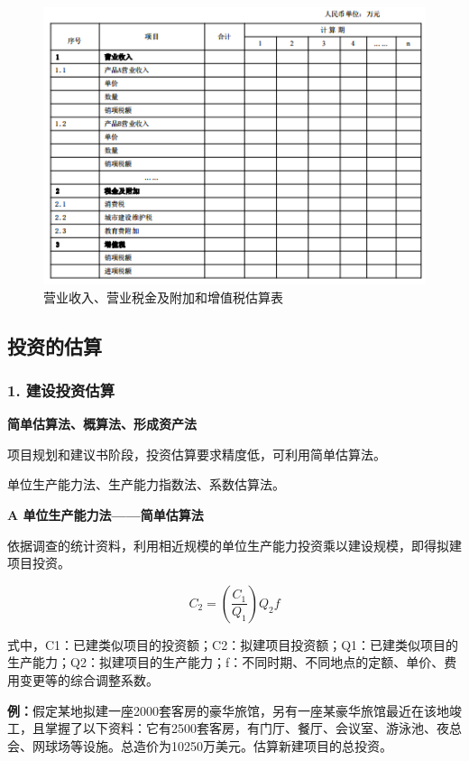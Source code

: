 \begin{figure}[H]
    \centering
    \includegraphics[width=1\linewidth]{image/营业收入、营业税金及附加和增值税估算表.png}
    \caption{营业收入、营业税金及附加和增值税估算表}
\end{figure}

\subsection{投资的估算}

\subsubsection{1. 建设投资估算}

\textbf{简单估算法、概算法、形成资产法}

项目规划和建议书阶段，投资估算要求精度低，可利用简单估算法。

单位生产能力法、生产能力指数法、系数估算法。

\noindent \textbf{A 单位生产能力法——简单估算法}

依据调查的统计资料，利用相近规模的单位生产能力投资乘以建设规模，即得拟建项目投资。

$$C_2=(\frac{C_1}{Q_1})Q_2f$$

式中，C1：已建类似项目的投资额；C2：拟建项目投资额；Q1：已建类似项目的生产能力；Q2：拟建项目的生产能力；f：不同时期、不同地点的定额、单价、费用变更等的综合调整系数。

\textbf{例：}假定某地拟建一座2000套客房的豪华旅馆，另有一座某豪华旅馆最近在该地竣工，且掌握了以下资料：它有2500套客房，有门厅、餐厅、会议室、游泳池、夜总会、网球场等设施。总造价为10250万美元。估算新建项目的总投资。

